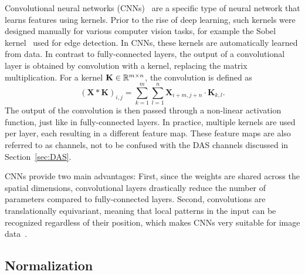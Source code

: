 Convolutional neural networks (CNNs)~\cite{CNN} are a specific type of neural network that learns features using kernels.
Prior to the rise of deep learning, such kernels were designed manually for various computer vision tasks, for example the Sobel kernel~\cite{Sobel} used for edge detection.
In CNNs, these kernels are automatically learned from data. In contrast to fully-connected layers, the output of a convolutional layer is obtained by convolution with a kernel, replacing the matrix multiplication.
For a kernel $\mathbf{K} \in \mathbb{R}^{m \times n}$, the convolution is defined as
\begin{equation}
    (\mathbf{X} \ast \mathbf{K})_{i,j} = \sum_{k=1}^{m}\sum_{l=1}^{n} \mathbf{X}_{i+m,j+n} \cdot \mathbf{K}_{k,l}.
\end{equation}
The output of the convolution is then passed through a non-linear activation function, just like in fully-connected layers.
In practice, multiple kernels are used per layer, each resulting in a different feature map.
These feature maps are also referred to as channels, not to be confused with the DAS channels discussed in Section~\ref{sec:DAS}.

CNNs provide two main advantages: First, since the weights are shared across the spatial dimensions, convolutional layers drastically reduce the number of parameters compared to fully-connected layers. 
Second, convolutions are translationally equivariant, meaning that local patterns in the input can be recognized regardless of their position, which makes CNNs very suitable for image data~\cite{DeepLearning}.

\subsection{Normalization}

